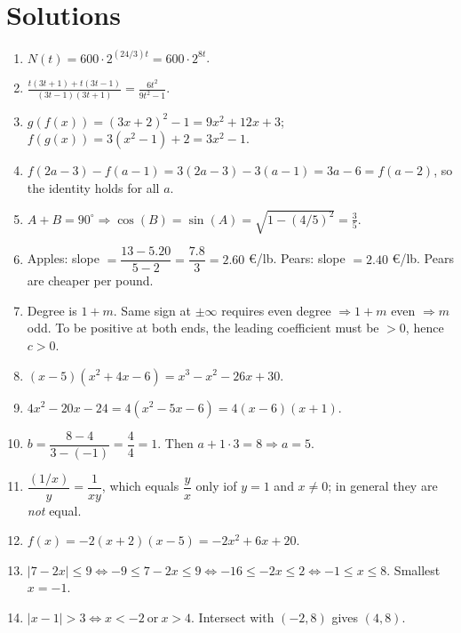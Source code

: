 \documentclass{article}
\begin{document}
\newpage
\section*{Solutions}

\begin{enumerate}[label=\textbf{\arabic*.}, leftmargin=*, itemsep=0.45em]

\item $N(t)=600\cdot 2^{(24/3)t}=600\cdot 2^{8t}$.

\item $\displaystyle \frac{t(3t+1)+t(3t-1)}{(3t-1)(3t+1)}=\frac{6t^2}{9t^2-1}$.

\item $g(f(x))=(3x+2)^2-1=9x^2+12x+3$; \quad $f(g(x))=3(x^2-1)+2=3x^2-1$.

\item $f(2a-3)-f(a-1)=3(2a-3)-3(a-1)=3a-6=f(a-2)$, so the identity holds for all $a$.

\item $A+B=90^\circ\Rightarrow \cos(B)=\sin (A)=\sqrt{1-(4/5)^2}=\frac{3}{5}$.

\item Apples: slope $=\dfrac{13-5.20}{5-2}=\dfrac{7.8}{3}=2.60$ €/lb. Pears: slope $=2.40$ €/lb. Pears are cheaper per pound.

\item Degree is $1+m$. Same sign at $\pm\infty$ requires even degree $\Rightarrow 1+m$ even $\Rightarrow m$ odd. To be positive at both ends, the leading coefficient must be $>0$, hence $c>0$.

\item $(x-5)(x^2+4x-6)=x^3- x^2-26x+30$.

\item $4x^2-20x-24=4(x^2-5x-6)=4(x-6)(x+1)$.

\item $b=\dfrac{8-4}{3-(-1)}=\dfrac{4}{4}=1$. Then $a+1\cdot 3=8\Rightarrow a=5$.

\item $\dfrac{(1/x)}{y}=\dfrac{1}{xy}$, which equals $\dfrac{y}{x}$ only iof $y = 1$ and $x \neq 0$; in general they are \emph{not} equal.

\item $f(x)=-2(x+2)(x-5)=-2x^2+6x+20$.

\item $|7-2x|\le 9\iff -9\le 7-2x\le 9 \iff -16\le -2x\le 2 \iff -1\le x\le 8$. Smallest $x=-1$.

\item $|x-1|>3\iff x< -2\ \text{or}\ x>4$. Intersect with $(-2,8)$ gives $(4,8)$.


\end{enumerate}
\end{document}
